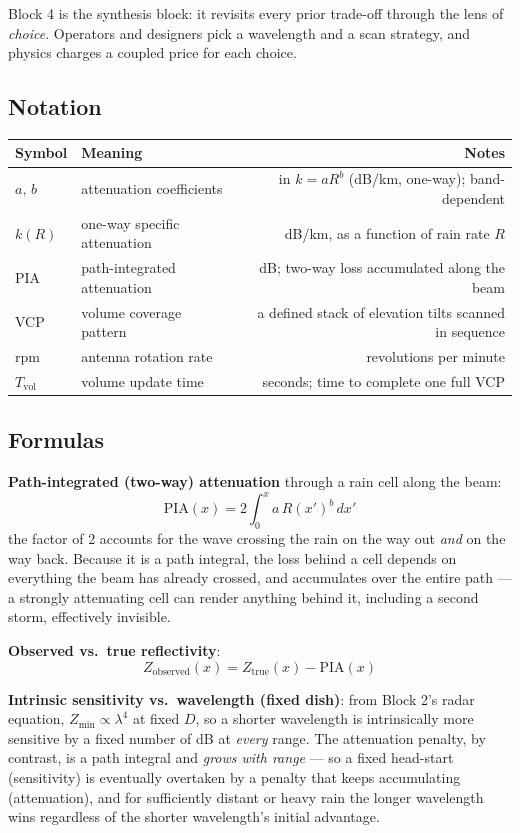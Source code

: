 \documentclass[11pt]{article}
\begin{document}
Block 4 is the synthesis block: it revisits every prior trade-off through the lens of \emph{choice}. Operators and designers pick a wavelength and a scan strategy, and physics charges a coupled price for each choice.

\subsection{Notation}
\begin{longtable}{L M N}
\toprule
Symbol & Meaning & Notes \\
\midrule
\endhead
$a,\,b$ & attenuation coefficients & in $k = aR^b$ (dB/km, one-way); band-dependent \\
$k(R)$ & one-way specific attenuation & dB/km, as a function of rain rate $R$ \\
PIA & path-integrated attenuation & dB; two-way loss accumulated along the beam \\
VCP & volume coverage pattern & a defined stack of elevation tilts scanned in sequence \\
rpm & antenna rotation rate & revolutions per minute \\
$T_{\mathrm{vol}}$ & volume update time & seconds; time to complete one full VCP \\
\bottomrule
\end{longtable}

\subsection{Formulas}

\textbf{Path-integrated (two-way) attenuation} through a rain cell along the beam:
\begin{equation}
\mathrm{PIA}(x) = 2\int_0^x a\,R(x')^{b}\,dx'
\end{equation}
the factor of 2 accounts for the wave crossing the rain on the way out \emph{and} on the way back. Because it is a path integral, the loss behind a cell depends on everything the beam has already crossed, and accumulates over the entire path --- a strongly attenuating cell can render anything behind it, including a second storm, effectively invisible.

\textbf{Observed vs.\ true reflectivity}:
\begin{equation}
Z_{\mathrm{observed}}(x) = Z_{\mathrm{true}}(x) - \mathrm{PIA}(x)
\end{equation}

\textbf{Intrinsic sensitivity vs.\ wavelength (fixed dish)}: from Block 2's radar equation, $Z_{\min}\propto\lambda^4$ at fixed $D$, so a shorter wavelength is intrinsically more sensitive by a fixed number of dB at \emph{every} range. The attenuation penalty, by contrast, is a path integral and \emph{grows with range} --- so a fixed head-start (sensitivity) is eventually overtaken by a penalty that keeps accumulating (attenuation), and for sufficiently distant or heavy rain the longer wavelength wins regardless of the shorter wavelength's initial advantage.
\end{document}
